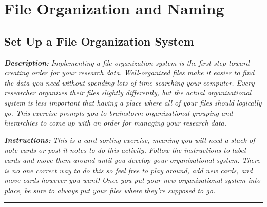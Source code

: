 \documentclass[
]{book}
\begin{document}
\hypertarget{file-organization-and-naming}{%
\chapter{File Organization and Naming}\label{file-organization-and-naming}}

\hypertarget{file-organization}{%
\section{Set Up a File Organization System}\label{file-organization}}

\textbf{\emph{Description:}} \emph{Implementing a file organization system is the first step toward creating order for your research data. Well-organized files make it easier to find the data you need without spending lots of time searching your computer. Every researcher organizes their files slightly differently, but the actual organizational system is less important that having a place where all of your files should logically go. This exercise prompts you to brainstorm organizational grouping and hierarchies to come up with an order for managing your research data.}

\textbf{\emph{Instructions:}} \emph{This is a card-sorting exercise, meaning you will need a stack of note cards or post-it notes to do this activity. Follow the instructions to label cards and move them around until you develop your organizational system. There is no one correct way to do this so feel free to play around, add new cards, and move cards however you want! Once you put your new organizational system into place, be sure to always put your files where they're supposed to go.}

\begin{center}\rule{0.5\linewidth}{0.5pt}\end{center}
\end{document}
